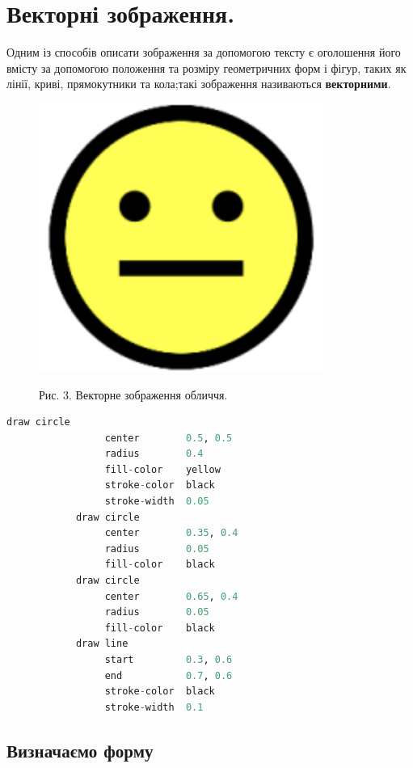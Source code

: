 \documentclass[a4paper,12pt]{article}
\begin{document}
    \section{Векторні зображення.}\label{sec:vector_images}
    Одним із способів описати зображення за допомогою тексту є оголошення його вмісту за допомогою положення та розміру геометричних форм і фігур, таких як лінії, криві, прямокутники та кола;такі зображення називаються \textbf{векторними}.

    \begin{figure}
        \label{fig:image3}
        \centering
        \includegraphics[scale=0.5]{image3.png}

        Рис. 3. Векторне зображення обличчя.
    \end{figure}

    \begin{lstlisting}[style=light, language=Python,label={lst:vectorimg},caption=Приклад векторного зображення]
            draw circle
                 center        0.5, 0.5
                 radius        0.4
                 fill-color    yellow
                 stroke-color  black
                 stroke-width  0.05
            draw circle
                 center        0.35, 0.4
                 radius        0.05
                 fill-color    black
            draw circle
                 center        0.65, 0.4
                 radius        0.05
                 fill-color    black
            draw line
                 start         0.3, 0.6
                 end           0.7, 0.6
                 stroke-color  black
                 stroke-width  0.1
    \end{lstlisting}

    \subsection{Визначаємо форму}\label{subsec:defining_shapes}
\end{document}
